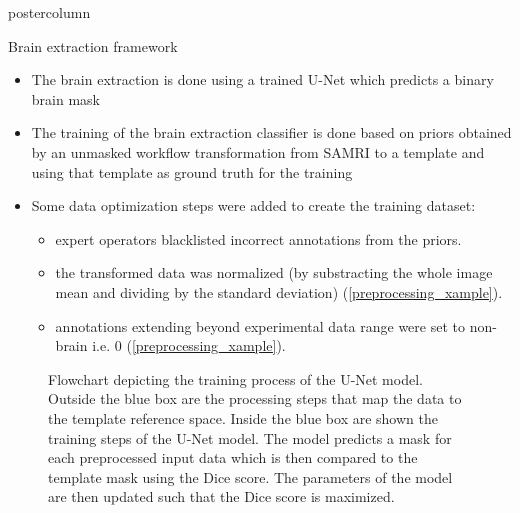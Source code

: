 \begin{frame}
\begin{columns}
\begin{column}{.42\textwidth}
\begin{beamercolorbox}[center]{postercolumn}
\begin{minipage}{.98\textwidth}
{%
                            \begin{myblock}{Brain extraction framework}
                                \begin{itemize}
                                    \item The brain extraction is done using a trained U-Net \cite{ronneberger_u-net:_2015} which predicts a binary brain mask
                                    \item The training of the brain extraction classifier is done based on priors obtained by an unmasked workflow transformation from \textcolor{lg}{SAMRI} \cite{irsabi} to a template and using that template as ground truth for the training
                                    \item Some data optimization steps were added to create the training dataset:
                                    \begin{itemize}
                                        \item expert operators blacklisted incorrect annotations from the priors.
                                        \item the transformed data was normalized (by substracting the whole image mean and dividing by the standard deviation) (\cref{preprocessing_xample}).
                                        \item annotations extending beyond experimental data range were set to non-brain i.e. 0 (\cref{preprocessing_xample}).

                                    \end{itemize}
                                \end{itemize}

                                \begin{figure}
                                    \centering
                                    \caption{Flowchart depicting the training process of the U-Net model. Outside the blue box are the processing steps that map the data to the template reference space. Inside the blue box are shown the training steps of the U-Net model. The model predicts a mask for each preprocessed input data which is then compared to the template mask using the Dice score. The parameters of the model are then updated such that the Dice score is maximized.}
                                    \label{training_graph}
                                \end{figure}


\end{myblock}}
\end{minipage}
\end{beamercolorbox}
\end{column}
\end{columns}
\end{frame}
